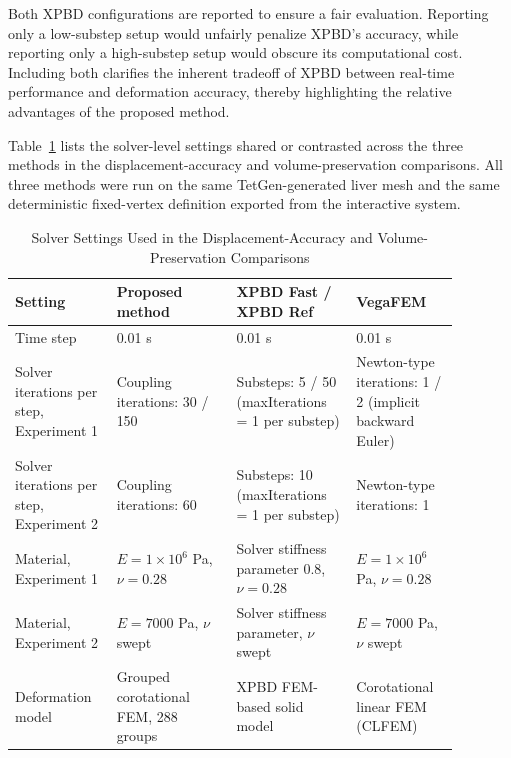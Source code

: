 \documentclass{ieeeaccess}
\begin{document}
Both XPBD configurations are reported to ensure a fair evaluation. Reporting only a low-substep setup would unfairly penalize XPBD's accuracy, while reporting only a high-substep setup would obscure its computational cost. Including both clarifies the inherent tradeoff of XPBD between real-time performance and deformation accuracy, thereby highlighting the relative advantages of the proposed method.

Table~\ref{tab:repro} lists the solver-level settings shared or contrasted across the three methods in the displacement-accuracy and volume-preservation comparisons. All three methods were run on the same TetGen-generated liver mesh and the same deterministic fixed-vertex definition exported from the interactive system.

\begin{table}[htbp]
\caption{Solver Settings Used in the Displacement-Accuracy and Volume-Preservation Comparisons}
\label{tab:repro}
\centering
\scriptsize
\renewcommand{\arraystretch}{1.15}
\setlength{\tabcolsep}{2pt}
\begin{tabular}{|p{0.20\linewidth}|p{0.24\linewidth}|p{0.24\linewidth}|p{0.20\linewidth}|}
\hline
Setting & Proposed method & XPBD Fast / XPBD Ref & VegaFEM \\
\hline
Time step & 0.01 s & 0.01 s & 0.01 s \\
\hline
Solver iterations per step, Experiment 1 & Coupling iterations: 30 / 150 & Substeps: 5 / 50 (maxIterations = 1 per substep) & Newton-type iterations: 1 / 2 (implicit backward Euler) \\
\hline
Solver iterations per step, Experiment 2 & Coupling iterations: 60 & Substeps: 10 (maxIterations = 1 per substep) & Newton-type iterations: 1 \\
\hline
Material, Experiment 1 & $E=1\times10^{6}$ Pa, $\nu=0.28$ & Solver stiffness parameter 0.8, $\nu=0.28$ & $E=1\times10^{6}$ Pa, $\nu=0.28$ \\
\hline
Material, Experiment 2 & $E=7000$ Pa, $\nu$ swept & Solver stiffness parameter, $\nu$ swept & $E=7000$ Pa, $\nu$ swept \\
\hline
Deformation model & Grouped corotational FEM, 288 groups & XPBD FEM-based solid model & Corotational linear FEM (CLFEM) \\
\hline
\end{tabular}
\end{table}
\end{document}
